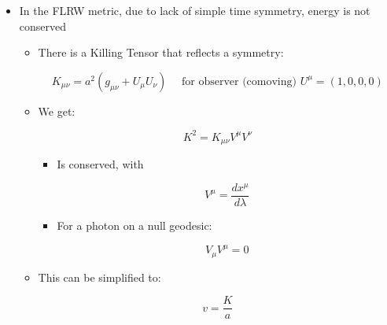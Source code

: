 \begin{itemize}
\begin{itemize}
      \item In the FLRW metric, due to lack of simple time symmetry, energy is not conserved

        \begin{itemize}

          \item There is a Killing Tensor that reflects a symmetry:

            $$K_{\mu\nu}=a^2(g_{\mu\nu}+U_{\mu}U_{\nu})\quad\text{ for observer (comoving) $U^{\mu}=(1,0,0,0)$}$$

          \item We get:

            $$K^2=K_{\mu\nu}V^{\mu}V^{\nu}$$

            \begin{itemize}

              \item Is conserved, with

                $$V^{\mu}=\frac{dx^{\mu}}{d\lambda}$$

              \item For a photon on a null geodesic:

                $$V_{\mu}V^{\mu}=0$$

            \end{itemize}

          \item This can be simplified to:

            $$v=\frac{K}{a}$$

        \end{itemize}

    \end{itemize}

\end{itemize}



